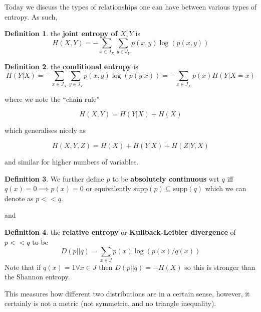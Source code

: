 \documentclass{article}
\theoremstyle{definition}
\newtheorem{definition}{Definition}
\begin{document}
Today we discuss the types of relationships one can have between various types
of entropy. As such,

\begin{definition}
  the \textbf{joint entropy of $X, Y$} is
  \begin{equation}
    H(X, Y) = - \sum_{x \in J_X} \sum_{y \in J_Y} p(x, y) \log(p(x, y))
  \end{equation}
\end{definition}

\begin{definition}
  the \textbf{conditional entropy} is
  \begin{equation}
    H(Y | X) = - \sum_{x \in J_X} \sum_{y \in J_Y} p(x, y) \log(p(y | x))
    = - \sum_{x \in J_X} p(x) H(Y | X = x)
  \end{equation}
\end{definition}

where we note the ``chain rule''

\begin{equation}
  H(X, Y) = H(Y | X) + H(X)
\end{equation}

which generalises nicely as

\begin{equation}
  H(X, Y, Z) = H(X) + H(Y | X) + H(Z | Y, X)
\end{equation}

and similar for higher numbers of variables.

\begin{definition}
  We further define $p$ to be \textbf{absolutely continuous} wrt $q$ iff $q(x) =
  0 \implies p(x) = 0$ or equivalently $\text{supp}(p) \subseteq \text{supp}(q)$
  which we can denote as $p << q$.
\end{definition}

and

\begin{definition}
  the \textbf{relative entropy} or \textbf{Kullback-Leibler divergence} of $p <<
  q$ to be
  \begin{equation}
    D(p || q) = \sum_{x \in J} p(x) \log(p(x) / q(x))
  \end{equation}
  Note that if $q(x) = 1 \forall x \in J$ then $D(p || q) = -H(X)$ so this is
  stronger than the Shannon entropy.
\end{definition}

This measures how different two distributions are in a certain sense, however,
it certainly is not a metric (not symmetric, and no triangle inequality).
\end{document}
